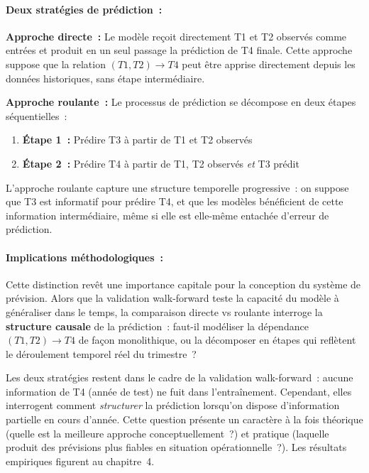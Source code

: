 \paragraph{Deux stratégies de prédiction~:}

\textbf{Approche directe~:} Le modèle reçoit directement T1 et T2 observés comme entrées
et produit en un seul passage la prédiction de T4 finale. Cette approche suppose que la
relation $(T1, T2) \to T4$ peut être apprise directement depuis les données historiques,
sans étape intermédiaire.

\textbf{Approche roulante~:} Le processus de prédiction se décompose en deux étapes
séquentielles~:
\begin{enumerate}
  \item \textbf{Étape 1~:} Prédire T3 à partir de T1 et T2 observés
  \item \textbf{Étape 2~:} Prédire T4 à partir de T1, T2 observés \textit{et} T3 prédit
\end{enumerate}

L'approche roulante capture une structure temporelle progressive~: on suppose que T3 est
informatif pour prédire T4, et que les modèles bénéficient de cette information
intermédiaire, même si elle est elle-même entachée d'erreur de prédiction.

\paragraph{Implications méthodologiques~:}

Cette distinction revêt une importance capitale pour la conception du système de
prévision. Alors que la validation walk-forward teste la capacité du modèle à
généraliser dans le temps, la comparaison directe vs roulante interroge la
\textbf{structure causale} de la prédiction~: faut-il modéliser la dépendance
$(T1, T2) \to T4$ de façon monolithique, ou la décomposer en étapes qui reflètent le
déroulement temporel réel du trimestre~?

Les deux stratégies restent dans le cadre de la validation walk-forward~: aucune
information de T4 (année de test) ne fuit dans l'entraînement. Cependant, elles
interrogent comment \textit{structurer} la prédiction lorsqu'on dispose d'information
partielle en cours d'année. Cette question présente un caractère à la fois théorique
(quelle est la meilleure approche conceptuellement~?) et pratique (laquelle produit
des prévisions plus fiables en situation opérationnelle~?). Les résultats empiriques
figurent au chapitre~4.

